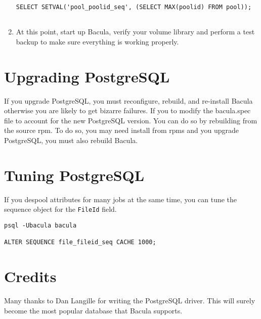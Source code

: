 \begin{enumerate}
\begin{verbatim}
SELECT SETVAL('pool_poolid_seq', (SELECT MAX(poolid) FROM pool));
       
\end{verbatim}
\normalsize

\item At this point, start up Bacula, verify your volume library and  perform
   a test backup to make sure everything is working  properly. 
\end{enumerate}

\section{Upgrading PostgreSQL}
If you upgrade PostgreSQL, you must reconfigure, rebuild, and re-install 
Bacula otherwise you are likely to get bizarre failures.  If you
to modify the bacula.spec file to account for the new PostgreSQL version.
You can do so by rebuilding from the source rpm. To do so, you may need
install from rpms and you upgrade PostgreSQL, you must also rebuild Bacula.

\section{Tuning PostgreSQL}

If you despool attributes for many jobs at the same time, you can tune the
sequence object for the \texttt{FileId} field.
\begin{verbatim}
psql -Ubacula bacula

ALTER SEQUENCE file_fileid_seq CACHE 1000;
\end{verbatim}

\section{Credits}
Many thanks to Dan Langille for writing the PostgreSQL driver. This will
surely become the most popular database that Bacula supports. 
